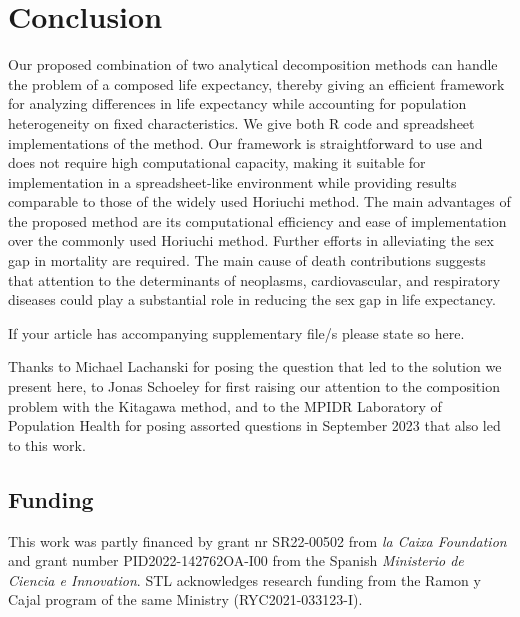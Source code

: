 \documentclass[12pt, sn-apa,pdflatex,letterpaper]{sn-jnl}
\begin{document}
\hypertarget{Conclusion}{%
\section*{Conclusion}\label{conclusion}

Our proposed combination of two analytical decomposition methods can handle the problem of a composed life expectancy, thereby giving an efficient framework for analyzing differences in life expectancy while accounting for population heterogeneity on fixed characteristics. We give both R code and spreadsheet implementations of the method. Our framework is straightforward to use and does not require high computational capacity, making it suitable for implementation in a spreadsheet-like environment while providing results comparable to those of the widely used Horiuchi method. The main advantages of the proposed method are its computational efficiency and ease of implementation over the commonly used Horiuchi method. Further efforts in alleviating the sex gap in mortality are required. The main cause of death contributions suggests that attention to the determinants of neoplasms, cardiovascular, and respiratory diseases could play a substantial role in reducing the sex gap in life expectancy.
 


\backmatter


If your article has accompanying supplementary file/s please state so here.


Thanks to Michael Lachanski for posing the question that led to the solution we present here, to Jonas Schoeley for first raising our attention to the composition problem with the Kitagawa method, and to the MPIDR Laboratory of Population Health for posing assorted questions in September 2023 that also led to this work.

\subsection*{Funding}\label{funding}

This work was partly financed by grant nr SR22-00502 from \emph{la Caixa Foundation} and grant number PID2022-142762OA-I00 from the Spanish \emph{Ministerio de Ciencia e Innovation}. STL acknowledges research funding from the Ramon y Cajal program of the same Ministry (RYC2021-033123-I).


}
\end{document}
